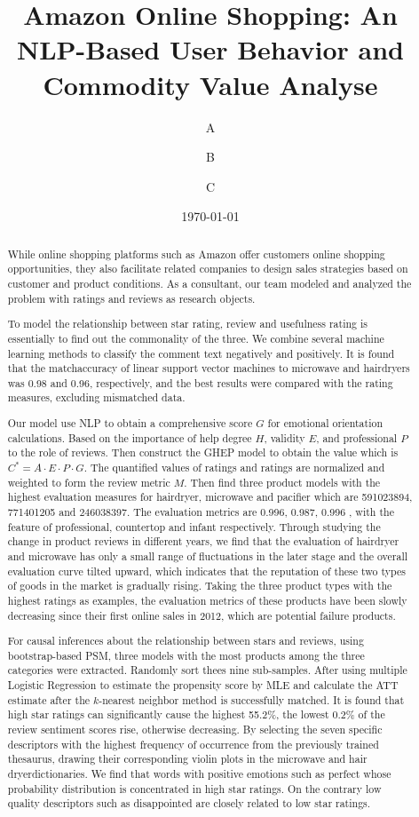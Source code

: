 \documentclass{mcmthesis}
\title{Amazon Online Shopping: An NLP-Based User Behavior and Commodity Value Analyse  }
\author{A \and B \and C}
\date{\today}
\begin{document}
\begin{abstract}
	\small
	
While online shopping platforms such as Amazon offer customers online shopping opportunities, they also facilitate related companies to design sales strategies based on customer and product conditions. As a consultant, our team modeled and analyzed the problem with ratings and reviews as research objects.	

To model the relationship between star rating, review and usefulness rating is essentially to find out the commonality of the three. We combine several machine learning methods to classify the comment text negatively and positively. It is found that the matchaccuracy of linear support vector machines to microwave and hairdryers was 0.98 and 0.96, respectively, and the best results were compared with the rating measures, excluding mismatched data.

Our model use NLP to obtain a comprehensive score $ G $ for emotional orientation calculations. Based on the importance of help degree $ H $, validity $ E $, and professional $ P $ to the role of reviews. Then construct the GHEP model to obtain the value which is $C^*=A\cdot E\cdot P\cdot G$. The quantified values of ratings and ratings are normalized and weighted to form the review metric $M$. Then find three product models with the highest evaluation measures for hairdryer, microwave and pacifier which are 591023894, 771401205 and 246038397. The evaluation metrics are 0.996, 0.987, 0.996
, with the feature of professional, countertop and infant respectively. Through studying the change in product reviews in different years, we find that the evaluation of hairdryer and microwave has only a small range of fluctuations in the later stage and the overall evaluation curve tilted upward, which indicates that the reputation of these two types of goods in the market is gradually rising. Taking the three product types with the highest ratings as examples, the evaluation metrics of these products have been slowly decreasing since their first online sales in 2012, which are potential failure products.

For causal inferences about the relationship between stars and reviews, using bootstrap-based PSM, three models with the most products among the three categories were extracted. Randomly sort thees nine sub-samples. After using multiple Logistic Regression to estimate the propensity score by MLE and calculate the ATT estimate after the $ k $-nearest neighbor method is successfully matched. It is found that high star ratings can significantly cause the highest 55.2\%, the lowest 0.2\% of the review sentiment scores rise, otherwise decreasing. By selecting the seven specific descriptors with the highest frequency of occurrence from the previously trained thesaurus, drawing their corresponding violin plots in the microwave and hair dryerdictionaries. We find that words with positive emotions such as perfect whose probability distribution is concentrated in high star ratings. On the contrary low quality descriptors such as disappointed are closely related to low star ratings.


\end{abstract}
\end{document}
